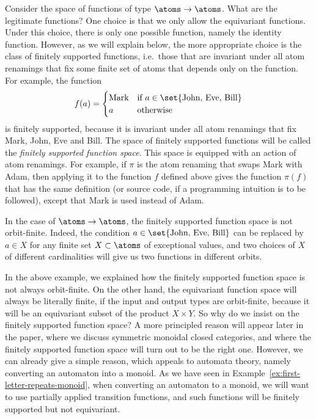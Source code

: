 \begin{example}
    Consider the space of functions of type $\atoms \to \atoms$. What are the legitimate functions? One choice is that we only allow the equivariant functions. Under this choice, there is only one possible function,  namely the identity function. However, as we will explain below, the more appropriate choice is the class of finitely supported functions, i.e.~those that are invariant under all atom renamings that fix some finite set of atoms that depends only on the function. For example,  the  function
    \begin{align*}
    f(a) = \begin{cases}
        \text{Mark} & \text{if $a \in \set{\text{John, Eve, Bill}}$} \\
        a & \text{otherwise}
    \end{cases}
    \end{align*}
    is finitely supported, because it is invariant under all atom renamings that fix Mark, John, Eve and Bill. The space of finitely supported functions will be called the \emph{finitely supported function space}. This space is equipped with an action of atom renamings. For example, if $\pi$ is the atom renaming that swaps Mark with Adam, then applying it to the function $f$ defined above gives the function $\pi(f)$ that has the same definition (or source code, if a programming intuition is to be followed), except that Mark is used instead of Adam.

    In the case of $\atoms \to \atoms$, the finitely supported function space is not orbit-finite. Indeed, the condition $a \in \set{\text{John, Eve, Bill}}$ can be replaced by $a \in X$ for any finite set $X \subset \atoms$ of exceptional values, and two choices of $X$ of different cardinalities will give us two functions in different orbits. \exampleend
\end{example}

In the above example, we explained how the finitely supported function space is not always orbit-finite. On the other hand, the equivariant function space will always be literally finite, if the input and output types are orbit-finite, because it will be an equivariant subset of the product $X \times Y$. So why do we insist on the finitely supported function space? A more principled reason will appear later in the paper, where we discuss symmetric monoidal closed categories, and where the finitely supported function space will turn out to be the right one. However, we can already give a simple reason, which appeals to automata theory, namely converting an automaton into a monoid. As we have seen in Example~\ref{ex:first-letter-repeats-monoid}, when converting an automaton to a monoid, we will want to use partially applied transition functions, and such functions will be finitely supported but not equivariant.


